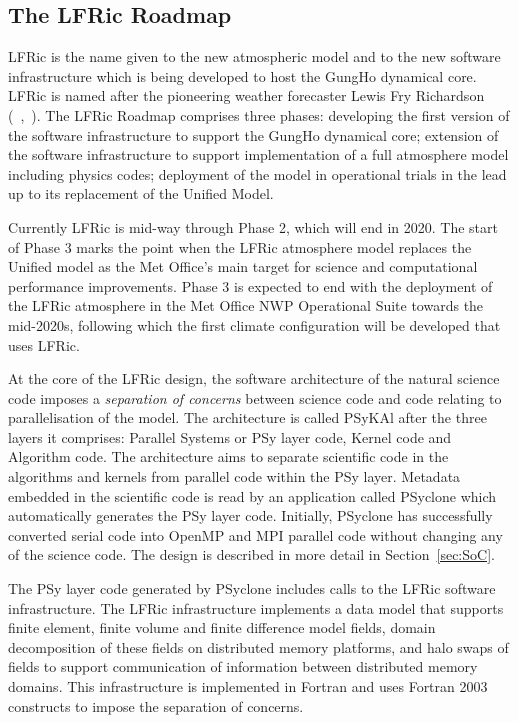 \documentclass[review,times]{elsarticle}
\begin{document}
\subsection{The LFRic Roadmap}

LFRic is the name given to the new atmospheric model and to the new
software infrastructure which is being developed to host the GungHo
dynamical core. LFRic is named after the pioneering weather forecaster
Lewis Fry Richardson (~\cite{Lynch2006},~\cite{ForecastFactory}). The
LFRic Roadmap comprises three phases: developing the first version of
the software infrastructure to support the GungHo dynamical core;
extension of the software infrastructure to support implementation of
a full atmosphere model including physics codes; deployment of the
model in operational trials in the lead up to its replacement of the
Unified Model.

Currently LFRic is mid-way through Phase 2, which will end in
2020. The start of Phase 3 marks the point when the LFRic atmosphere
model replaces the Unified model as the Met Office's main target for
science and computational performance improvements. Phase 3 is
expected to end with the deployment of the LFRic atmosphere in the Met
Office NWP Operational Suite towards the mid-2020s, following which
the first climate configuration will be developed that uses LFRic.

At the core of the LFRic design, the software architecture of the
natural science code imposes a {\em separation of concerns} between
science code and code relating to parallelisation of the model. The
architecture is called PSyKAl after the three layers it comprises:
Parallel Systems or PSy layer code, Kernel code and Algorithm
code. The architecture aims to separate scientific code in the
algorithms and kernels from parallel code within the PSy
layer. Metadata embedded in the scientific code is read by an
application called PSyclone which automatically generates the PSy
layer code. Initially, PSyclone has successfully converted serial code
into OpenMP and MPI parallel code without changing any of the science
code. The design is described in more detail in Section~\ref{sec:SoC}.

The PSy layer code generated by PSyclone includes calls to the LFRic
software infrastructure. The LFRic infrastructure implements a data
model that supports finite element, finite volume and finite
difference model fields, domain decomposition of these fields on
distributed memory platforms, and halo swaps of fields to support
communication of information between distributed memory domains. This
infrastructure is implemented in Fortran and uses Fortran 2003
constructs to impose the separation of concerns.
\end{document}
